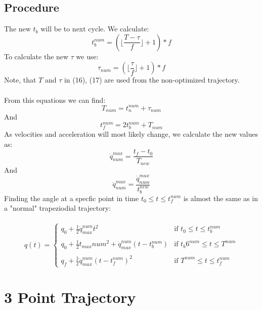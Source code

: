 \documentclass{article}
\begin{document}
	\subsection{Procedure}
	The new $t_b$ will be to next cycle. We calculate:
	\begin{equation}
	t_{b}^{num} = (\lfloor \frac{T-\tau}{f}\rfloor + 1) * f
	\end{equation}
	To calculate the new $\tau$ we use:
	\begin{equation}
	\tau_{num} = (\lfloor \frac{\tau}{f}\rfloor +1)*f
	\end{equation}
	Note, that $T$ and $\tau$ in (16), (17) are used from the non-optimized trajectory.\\\\
	From this equations we can find:
	\begin{equation}
	T_{num} = t_{n}^{num} + \tau_{num}
	\end{equation}
	And
	\begin{equation}
	t_{f}^{num} = 2t_{b}^{num} + T_{num}
	\end{equation}
	As velocities and acceleration will most likely change, we calculate the new values as:
	\begin{equation}
	\dot{q}_{num}^{max} = \frac{t_f-t_0}{T_{new}}
	\end{equation}
	And
	\begin{equation}
	\ddot{q}_{num}^{max} = \frac{\dot{q}_{num}^{max}}{t_{b}^{new}}
	\end{equation}
	Finding the angle at a specfic point in time $t_{0}\leq t \leq t_{f}^{num}$ is almost the same as in a "normal" trapeziodial trajectory:\\\\
	\begin{equation}
	q(t) =
\left\{
	\begin{array}{ll}
		q_{0}+\frac{1}{2}\ddot{q}_{max}^{num}t^{2}  & \mbox{if } t_{0}\leq t \leq t_{b}^{num} \\\\
		q_{0}+\frac{1}{2}t_{max}{num}^{2}+ \dot{q}_{max}^{num}(t-t_{b}^{num}) & \mbox{if } t_{b}6^{num}\leq t \leq T^{num} \\\\
		q_{f}+\frac{1}{2}\ddot{q}_{max}^{num}(t-t_{f}^{num})^{2} & \mbox{if }T^{num}\leq t \leq t_{f}^{num}
	\end{array}
\right.
	\end{equation}
	\newpage
	\section{3 Point Trajectory}
\end{document}
